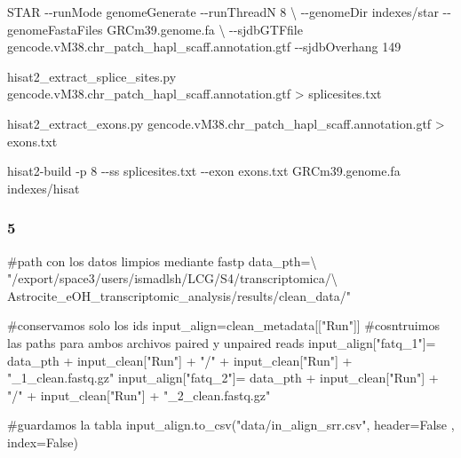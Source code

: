 \documentclass[
  9pt,
]{article}
\newenvironment{Shaded}{\begin{snugshade}}{\end{snugshade}}
\newcommand{\NormalTok}[1]{\textcolor[rgb]{0.00,0.23,0.31}{#1}}
\begin{document}
\begin{Shaded}
\begin{Highlighting}[]

\NormalTok{STAR {-}{-}runMode genomeGenerate {-}{-}runThreadN 8 \textbackslash{}}
\NormalTok{{-}{-}genomeDir indexes/star {-}{-}genomeFastaFiles GRCm39.genome.fa \textbackslash{}}
\NormalTok{{-}{-}sjdbGTFfile gencode.vM38.chr\_patch\_hapl\_scaff.annotation.gtf {-}{-}sjdbOverhang 149}
\end{Highlighting}
\end{Shaded}

\begin{Shaded}
\begin{Highlighting}[]
\NormalTok{hisat2\_extract\_splice\_sites.py gencode.vM38.chr\_patch\_hapl\_scaff.annotation.gtf \textgreater{} splicesites.txt}

\NormalTok{hisat2\_extract\_exons.py gencode.vM38.chr\_patch\_hapl\_scaff.annotation.gtf \textgreater{} exons.txt}

\NormalTok{hisat2{-}build {-}p 8 {-}{-}ss splicesites.txt {-}{-}exon exons.txt GRCm39.genome.fa indexes/hisat}
\end{Highlighting}
\end{Shaded}

\subsubsection{5}\label{section-4}

\begin{Shaded}
\begin{Highlighting}[]

\NormalTok{\#path con los datos limpios mediante fastp}
\NormalTok{data\_pth=\textbackslash{}}
\NormalTok{"/export/space3/users/ismadlsh/LCG/S4/transcriptomica/\textbackslash{}}
\NormalTok{Astrocite\_eOH\_transcriptomic\_analysis/results/clean\_data/"}

\NormalTok{\#conservamos solo los ids}
\NormalTok{input\_align=clean\_metadata[["Run"]]}
\NormalTok{\#cosntruimos las paths para ambos archivos paired y unpaired reads}
\NormalTok{input\_align["fatq\_1"]= data\_pth + input\_clean["Run"] + "/" + input\_clean["Run"] + "\_1\_clean.fastq.gz" }
\NormalTok{input\_align["fatq\_2"]= data\_pth + input\_clean["Run"] + "/" + input\_clean["Run"] + "\_2\_clean.fastq.gz" }

\NormalTok{\#guardamos la tabla }
\NormalTok{input\_align.to\_csv("data/in\_align\_srr.csv", header=False , index=False)}
\end{Highlighting}
\end{Shaded}
\end{document}
